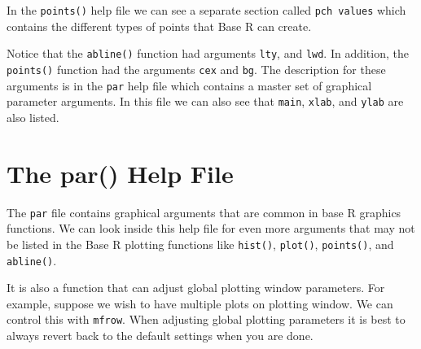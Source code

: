 \documentclass[
]{book}
\newenvironment{Shaded}{\begin{snugshade}}{\end{snugshade}}
\newcommand{\CommentTok}[1]{\textcolor[rgb]{0.56,0.35,0.01}{\textit{#1}}}
\newcommand{\DataTypeTok}[1]{\textcolor[rgb]{0.13,0.29,0.53}{#1}}
\newcommand{\DecValTok}[1]{\textcolor[rgb]{0.00,0.00,0.81}{#1}}
\newcommand{\KeywordTok}[1]{\textcolor[rgb]{0.13,0.29,0.53}{\textbf{#1}}}
\newcommand{\NormalTok}[1]{#1}
\newcommand{\OperatorTok}[1]{\textcolor[rgb]{0.81,0.36,0.00}{\textbf{#1}}}
\begin{document}
In the \texttt{points()} help file we can see a separate section called \texttt{pch\ values} which contains the different types of points that Base R can create.

Notice that the \texttt{abline()} function had arguments \texttt{lty}, and \texttt{lwd}. In addition, the \texttt{points()} function had the arguments \texttt{cex} and \texttt{bg}. The description for these arguments is in the \texttt{par} help file which contains a master set of graphical parameter arguments. In this file we can also see that \texttt{main}, \texttt{xlab}, and \texttt{ylab} are also listed.

\hypertarget{the-par-help-file}{%
\section{The par() Help File}\label{the-par-help-file}}

The \texttt{par} file contains graphical arguments that are common in base R graphics functions. We can look inside this help file for even more arguments that may not be listed in the Base R plotting functions like \texttt{hist()}, \texttt{plot()}, \texttt{points()}, and \texttt{abline()}.

It is also a function that can adjust global plotting window parameters. For example, suppose we wish to have multiple plots on plotting window. We can control this with \texttt{mfrow}. When adjusting global plotting parameters it is best to always revert back to the default settings when you are done.

\begin{Shaded}
\end{Shaded}
\end{document}
